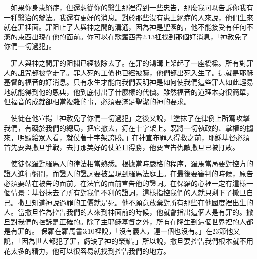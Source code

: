 \documentclass{book}
\begin{document}
\begin{center}
\noindent{}
\end{center}

　如果你身患絕症，但還想從你的醫生那裡得到一些忠告，那麼我可以告訴你我有一種醫治的辦法。我還有更好的消息。對於那些沒有患上絕症的人來說，他們生來就在罪裡面。罪阻止了人與神之間的溝通，因為神是聖潔的，他不能接受有任何不潔的東西出現在他的面前。你可以在歌羅西書2:13裡找到那個好消息，「神赦免了你們一切過犯」。

　罪人與神之間罪的阻攔已經被除去了。在罪的鴻溝上架起了一座橋樑。所有對罪人的詛咒都被拿走了。罪人死的工價也已經被贖，他們都出死入生了。這就是耶穌基督的福音的好消息。只有永生才能向我們表明神是如何使我們這些罪人如此輕易地就能得到他的恩典，他到底付出了什麼樣的代價。雖然福音的道理本身很簡單，但福音的成就卻相當複雜的事，必須要滿足聖潔的神的要求。

　使徒在他宣揚「神赦免了你們一切過犯」之後又說，「塗抹了在律例上所寫攻擊我們，有礙於我們的總局，把它撤去，釘在十字架上。既將一切執政的、掌權的擄來，明顯給眾人看，就仗著十字架誇勝。」在神宣布罪人得救之前，耶穌基督必須首先要與撒旦爭戰，去打那美好的仗並且得勝，他要宣告仇敵撒旦已被打敗。

　使徒保羅對羅馬人的律法相當熟悉。根據當時嚴格的程序，羅馬當局要對控方的證人進行盤問，而證人的證詞要被呈現到羅馬法庭上。在最後要審判的時候，原告必須要站在被告的面前，在法官的面前宣告他的證詞。在保羅的心裡一定有這樣一個情景：基督抹去了所有對我們不利的證詞，這樣指控我們的人就只剩下了撒旦自己。撒旦知道神說過罪的工價就是死。他不願意放棄對所有那些在他國度裡出生的人。當撒旦作為控告我們的人來到神面前的時候，他就會指出這個人是有罪的。撒旦對我們的控訴是正確的。除了主耶穌基督之外，所有在降生到這個世界裡的人都是有罪的。 保羅在羅馬書3:10裡說，「沒有義人，連一個也沒有。」在23節他又說，「因為世人都犯了罪，虧缺了神的榮耀。」所以說，撒旦要控告我們根本就不用花太多的精力，他可以很容易就找到控告我們的地方。
\end{document}
